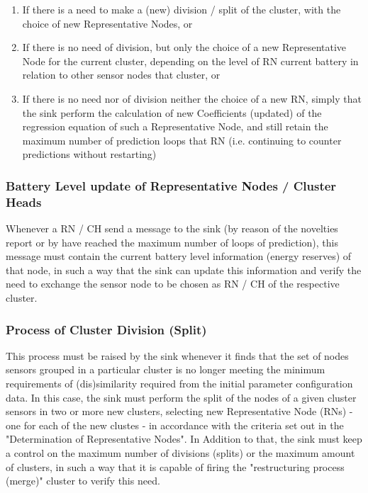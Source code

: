 \documentclass[conference]{IEEEtran}
\begin{document}
\begin{enumerate}
    \item If there is a need to make a (new) division / split of the cluster,
    with the choice of new Representative Nodes, or
    \item If there is no need of division, but only the choice of a new
    Representative Node for the current cluster, depending on the level of RN
    current battery in relation to other sensor nodes that cluster, or
    \item If there is no need nor of division neither the choice of a new RN,
    simply that the sink perform the calculation of new Coefficients (updated)
    of the regression equation of such a Representative Node, and still retain
    the maximum number of prediction loops that RN (i.e. continuing to counter
    predictions without restarting)
\end{enumerate}

\subsubsection{Battery Level update of Representative Nodes / Cluster Heads}

Whenever a RN / CH send a message to the sink (by reason of the novelties report
or by have reached the maximum number of loops of prediction), this message must
contain the current battery level information (energy reserves) of that node, in
such a way that the sink can update this information and verify the need to
exchange the sensor node to be chosen as RN / CH of the respective cluster.

\subsubsection{Process of Cluster Division (Split)}

This process must be raised by the sink whenever it finds that the set of nodes
sensors grouped in a particular cluster is no longer meeting the minimum
requirements of (dis)similarity required from the initial parameter
configuration data. In this case, the sink must perform the split of the nodes
of a given cluster sensors in two or more new clusters, selecting new
Representative Node (RNs) - one for each of the new clustes - in accordance with
the criteria set out in the "Determination of Representative Nodes". In Addition
to that, the sink must keep a control on the maximum number of divisions
(splits) or the maximum amount of clusters, in such a way that it is capable of
firing the "restructuring process (merge)" cluster to verify this need.
\end{document}
